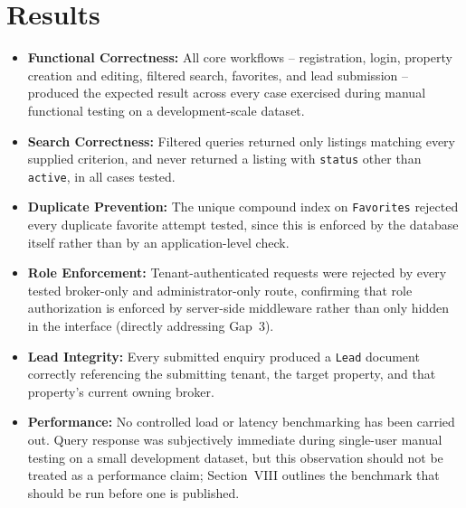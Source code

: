 \documentclass[10pt,twocolumn]{article}
\begin{document}
\section{Results}
\begin{itemize}
\item \textbf{Functional Correctness:} All core workflows -- registration, login, property creation and editing, filtered search, favorites, and lead submission -- produced the expected result across every case exercised during manual functional testing on a development-scale dataset.
\item \textbf{Search Correctness:} Filtered queries returned only listings matching every supplied criterion, and never returned a listing with \texttt{status} other than \texttt{active}, in all cases tested.
\item \textbf{Duplicate Prevention:} The unique compound index on \texttt{Favorites} rejected every duplicate favorite attempt tested, since this is enforced by the database itself rather than by an application-level check.
\item \textbf{Role Enforcement:} Tenant-authenticated requests were rejected by every tested broker-only and administrator-only route, confirming that role authorization is enforced by server-side middleware rather than only hidden in the interface (directly addressing Gap~3).
\item \textbf{Lead Integrity:} Every submitted enquiry produced a \texttt{Lead} document correctly referencing the submitting tenant, the target property, and that property's current owning broker.
\item \textbf{Performance:} No controlled load or latency benchmarking has been carried out. Query response was subjectively immediate during single-user manual testing on a small development dataset, but this observation should not be treated as a performance claim; Section~VIII outlines the benchmark that should be run before one is published.
\end{itemize}

\end{document}
